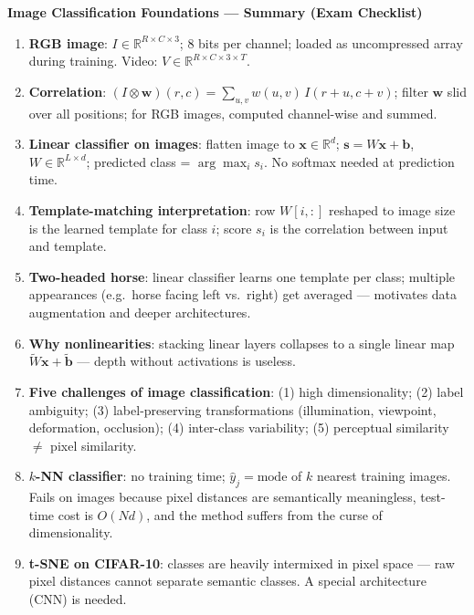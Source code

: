 \documentclass[11pt,a4paper]{article}
\begin{document}
\begin{tcolorbox}[colback=WarningRedBg,colframe=WarningRed,boxrule=0.8pt,arc=3pt]
\textbf{Image Classification Foundations — Summary (Exam Checklist)}
\begin{enumerate}
  \item \textbf{RGB image}: $I \in \mathbb{R}^{R \times C \times 3}$; 8 bits per channel; loaded as
    uncompressed array during training.  Video: $V \in \mathbb{R}^{R \times C \times 3 \times T}$.
  \item \textbf{Correlation}: $(I \otimes \mathbf{w})(r,c) = \sum_{u,v} w(u,v)\,I(r{+}u, c{+}v)$;
    filter $\mathbf{w}$ slid over all positions; for RGB images, computed channel-wise and summed.
  \item \textbf{Linear classifier on images}: flatten image to $\mathbf{x} \in \mathbb{R}^d$;
    $\mathbf{s} = W\mathbf{x} + \mathbf{b}$, $W \in \mathbb{R}^{L \times d}$; predicted class =
    $\arg\max_i s_i$.  No softmax needed at prediction time.
  \item \textbf{Template-matching interpretation}: row $W[i,:]$ reshaped to image size is the learned
    template for class $i$; score $s_i$ is the correlation between input and template.
  \item \textbf{Two-headed horse}: linear classifier learns one template per class; multiple appearances
    (e.g.\ horse facing left vs.\ right) get averaged — motivates data augmentation and deeper architectures.
  \item \textbf{Why nonlinearities}: stacking linear layers collapses to a single linear map
    $\widetilde{W}\mathbf{x} + \tilde{\mathbf{b}}$ — depth without activations is useless.
  \item \textbf{Five challenges of image classification}: (1) high dimensionality; (2) label ambiguity;
    (3) label-preserving transformations (illumination, viewpoint, deformation, occlusion); (4)
    inter-class variability; (5) perceptual similarity $\neq$ pixel similarity.
  \item \textbf{$k$-NN classifier}: no training time; $\hat{y}_j = \mathrm{mode}$ of $k$ nearest
    training images.  Fails on images because pixel distances are semantically meaningless, test-time
    cost is $O(Nd)$, and the method suffers from the curse of dimensionality.
  \item \textbf{t-SNE on CIFAR-10}: classes are heavily intermixed in pixel space — raw pixel distances
    cannot separate semantic classes.  A special architecture (CNN) is needed.
\end{enumerate}
\end{tcolorbox}
\end{document}
